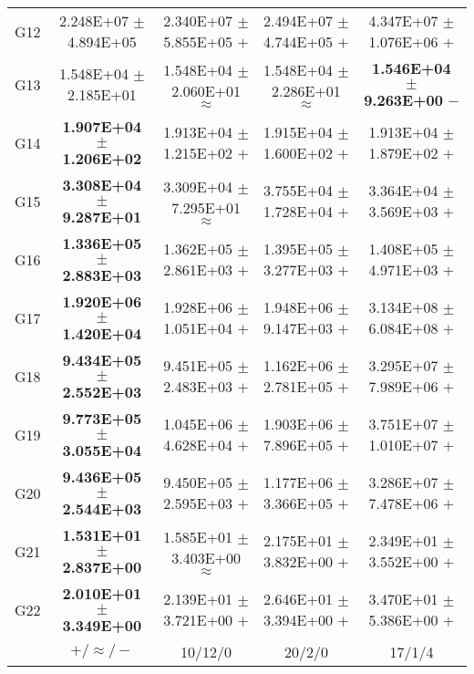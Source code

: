 \documentclass[paper]{ieice}
\begin{document}
\begin{table*}[htbp]
\begin{tabular}{c|c|c|c|c}
		G12	&	2.248E+07	$\pm$	4.894E+05		&	2.340E+07	$\pm$	5.855E+05	$+$	&	2.494E+07	$\pm$	4.744E+05	$+$	&	4.347E+07	$\pm$	1.076E+06	$+$	\\
		G13	&	1.548E+04	$\pm$	2.185E+01		&	1.548E+04	$\pm$	2.060E+01	$\approx$	&	1.548E+04	$\pm$	2.286E+01	$\approx$	&	\textbf{1.546E+04	$\pm$	9.263E+00}	$-$	\\
		G14	&	\textbf{1.907E+04	$\pm$	1.206E+02}		&	1.913E+04	$\pm$	1.215E+02	$+$	&	1.915E+04	$\pm$	1.600E+02	$+$	&	1.913E+04	$\pm$	1.879E+02	$+$	\\
		G15	&	\textbf{3.308E+04	$\pm$	9.287E+01}		&	3.309E+04	$\pm$	7.295E+01	$\approx$	&	3.755E+04	$\pm$	1.728E+04	$+$	&	3.364E+04	$\pm$	3.569E+03	$+$	\\
		G16	&	\textbf{1.336E+05	$\pm$	2.883E+03}		&	1.362E+05	$\pm$	2.861E+03	$+$	&	1.395E+05	$\pm$	3.277E+03	$+$	&	1.408E+05	$\pm$	4.971E+03	$+$	\\
		G17	&	\textbf{1.920E+06	$\pm$	1.420E+04}		&	1.928E+06	$\pm$	1.051E+04	$+$	&	1.948E+06	$\pm$	9.147E+03	$+$	&	3.134E+08	$\pm$	6.084E+08	$+$	\\
		G18	&	\textbf{9.434E+05	$\pm$	2.552E+03}		&	9.451E+05	$\pm$	2.483E+03	$+$	&	1.162E+06	$\pm$	2.781E+05	$+$	&	3.295E+07	$\pm$	7.989E+06	$+$	\\
		G19	&	\textbf{9.773E+05	$\pm$	3.055E+04}		&	1.045E+06	$\pm$	4.628E+04	$+$	&	1.903E+06	$\pm$	7.896E+05	$+$	&	3.751E+07	$\pm$	1.010E+07	$+$	\\
		G20	&	\textbf{9.436E+05	$\pm$	2.544E+03}		&	9.450E+05	$\pm$	2.595E+03	$+$	&	1.177E+06	$\pm$	3.366E+05	$+$	&	3.286E+07	$\pm$	7.478E+06	$+$	\\
		G21	&	\textbf{1.531E+01	$\pm$	2.837E+00}		&	1.585E+01	$\pm$	3.403E+00	$\approx$	&	2.175E+01	$\pm$	3.832E+00	$+$	&	2.349E+01	$\pm$	3.552E+00	$+$	\\
		G22	&	\textbf{2.010E+01	$\pm$	3.349E+00}		&	2.139E+01	$\pm$	3.721E+00	$+$	&	2.646E+01	$\pm$	3.394E+00	$+$	&	3.470E+01	$\pm$	5.386E+00	$+$	\\  \hline
		
		&	$+/\approx/-$				&	10/12/0				&	20/2/0				&	17/1/4				\\ \hline
		

\end{tabular}
\end{table*}
\end{document}
